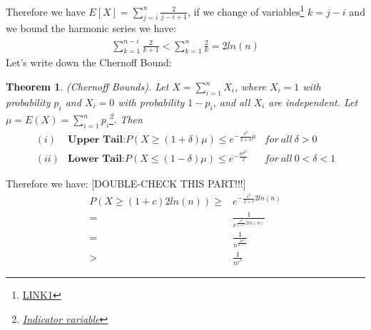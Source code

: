 \documentclass[a4paper]{article}
\newtheorem{theorem}{Theorem}
\begin{document}
Therefore we have $E[X]= \sum_{j=i}^n \frac{2}{j-i+1}$, if we change of variables\footnote{\href{http://math.stackexchange.com/questions/342061/double-summation-index-change-clarification}{LINK1}} $k= j-i$ and we bound the harmonic series we have:
\begin{align*}
\sum_{k=1}^{n-i} \frac{2}{k+1} < \sum_{k=1}^{n} \frac{2}{k}= 2 ln(n)
\end{align*}
Let's write down the Chernoff Bound:
\begin{theorem}
(Chernoff Bounds). Let $X=\sum_{i=1}^n X_{i}$, where $X_i = 1$ with probability $p_i$ and $X_i = 0$ with probability $1 − p_i$, and all $X_i$ are independent. Let $\mu = E(X) = \sum_{i=1}^n p_i$\footnote{\href{http://heather.cs.ucdavis.edu/~matloff/132/GenderExample.pdf}{Indicator variable}}. Then
\begin{align*}
(i) &\textbf{Upper Tail:} P(X \geq (1 + \delta)\mu) \leq e^{-\frac{\delta^2}{2+\delta}\mu} &for \ all \ \delta > 0 \\
(ii) &\textbf{Lower Tail:} P(X \leq (1 - \delta)\mu) \leq e^{-\frac{\mu\delta^2}{2}}      &for \ all \ 0< \delta < 1 
\end{align*}
\end{theorem}
Therefore we have: [DOUBLE-CHECK THIS PART!!!] 
\begin{align*}
P(X \geq (1 + c)2ln(n))\geq & e^{-\frac{c^2}{2+c}2ln(n)} \\
						=   & \frac{1}{e^{\frac{c^2}{2+c}2ln(n)}}\\
						=   & \frac{1}{n^{\frac{2c^2}{2+c}}}\\
						>   & \frac{1}{n^{c^3}}
\end{align*}
\end{document}
